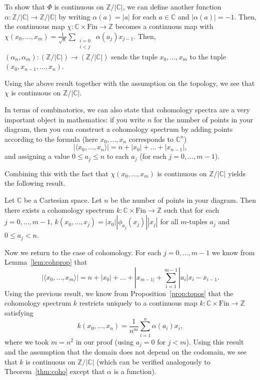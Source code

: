 \documentclass[a4paper,reqno,oneside]{article}
\begin{document}
To show that $\Phi$ is continuous on $\mathbb Z/|\mathbb C|$, we can define another function $\alpha\colon \mathbb Z/|\mathbb C| \to \mathbb Z/|\mathbb C|$ by writing $\alpha(a)=|a|$ for each $a\in\mathbb C$ and $|\alpha(a)|=-1$. Then, the continuous map $\chi: \mathbb C\times \text{Fin}\to \mathbb Z$ becomes a continuous map with $\chi(x_0,\dots,x_m)=\frac{1}{\sqrt{n}}\sum_{\substack{\substack{i=0\\ i<j}}} \alpha(a_j)x_{j-1}$. Then, $(\alpha_{n},\alpha_{m})\colon (\mathbb Z/|\mathbb C|)\to (\mathbb Z/|\mathbb C|)$ sends the tuple $x_0,\dots,x_m$ to the tuple $(x_0,x_{n-1},\dots,x_n)$. 

Using the above result together with the assumption on the topology, we see that $\chi$ is continuous on $\mathbb Z/|\mathbb C|$.

In terms of combinatorics, we can also state that cohomology spectra are a very important object in mathematics: if you write $n$ for the number of points in your diagram, then you can construct a cohomology spectrum by adding points according to the formula (here $x_0,\dots,x_n$ corresponds to $\mathbb C^n$)
\[
|\langle x_0,\dots,x_n\rangle|=n+|x_0|+\dots+|x_{n-1}|,
\]
and assigning a value $0\leq a_j\leq n$ to each $a_j$ (for each $j=0,\dots,m-1$).

Combining this with the fact that $\chi(x_0,\dots,x_m)$ is continuous on $\mathbb Z/|\mathbb C|$ yields the following result.

\begin{corollary}\label{cor:coho}
Let $\mathbb C$ be a Cartesian space. Let $n$ be the number of points in your diagram. Then there exists a cohomology spectrum $k:\mathbb C\times \text{Fin}\to\mathbb Z$ such that for each $j=0,\dots,m-1$, $k(x_0,\dots,x_j)=|x_0||\phi_{a_j}(x_j)||x_j|$ for all $m$-tuples $a_j$ and $0\leq a_j<n$.
\end{corollary}

Now we return to the case of cohomology. For each $j=0,\dots,m-1$ we know from Lemma~\ref{lem:cohprop} that 
\[
|\langle x_0,\dots,x_m\rangle|=n+|x_0|+\dots+|x_{m-1|}+\sum_{i=1}^{m-1}|a_i|{x_{i}-\overline{x}_{i-1}}.
\]
Using the previous result, we know from Proposition~\ref{prop:topos} that the cohomology spectrum $k$ restricts uniquely to a continuous map $k:\mathbb C\times \text{Fin}\to\mathbb Z$ satisfying
\[
k(x_0,\dots,x_n)=\frac{1}{n^m}\sum_{i=1}^{n}\alpha(a_i)x_i,
\]
where we took $m=n^2$ in our proof (using $a_j=0$ for $j<m$). Using this result and the assumption that the domain does not depend on the codomain, we see that $k$ is continuous on $\mathbb Z/|\mathbb C|$ (which can be verified analogously to Theorem~\ref{thm:coho} except that $\alpha$ is a function). 
\end{document}

